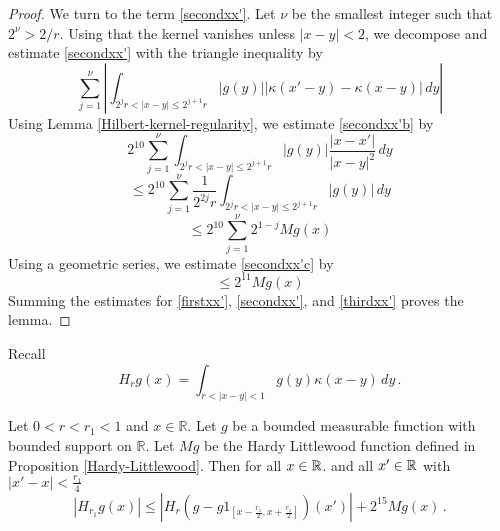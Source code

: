 {\begin{proof}
We turn to the term \eqref{secondxx'}.
Let $\nu$ be the smallest integer
such that $2^\nu> 2/r$.
Using that the kernel vanishes unless $|x-y|<2$, we decompose and estimate
\eqref{secondxx'}
with the triangle inequality by
\begin{equation}\label{secondxx'b}
 \sum_{j=1}^\nu  \left|\int_{2^jr<|x-y|\le 2^{j+1}r}
|g(y)| |\kappa(x'-y)-\kappa(x-y)|\, dy
\right|
\end{equation}
Using Lemma \ref{Hilbert-kernel-regularity}, we estimate  \eqref{secondxx'b}
by
\begin{equation*}
 2^{10}\sum_{j=1}^\nu  \int_{2^jr<|x-y|\le 2^{j+1}r}
|g(y)| \frac{|x-x'|}{|x-y|^2}\, dy
\end{equation*}
\begin{equation*}
\le  2^{10}\sum_{j=1}^\nu  \frac 1{2^{2j}r}\int_{2^jr<|x-y|\le 2^{j+1}r}
|g(y)| \, dy
\end{equation*}
\begin{equation}\label{secondxx'c}
\le  2^{10}\sum_{j=1}^\nu {2^{1-j}} Mg(x)
\end{equation}
Using a geometric series, we estimate
\eqref{secondxx'c} by
\begin{equation}\label{secondxx'd}
\le  2^{11} Mg(x)
\end{equation}
Summing the estimates
for \eqref{firstxx'},
\eqref{secondxx'}, and
\eqref{thirdxx'}
proves the lemma.
\end{proof}

Recall
\begin{equation*}
    H_rg(x)=\int_{r<|x-y|<1} g(y) \kappa(x-y)\, dy\, .
\end{equation*}


\begin{lemma}
\label{Cotlar-control}
Let $0<r<r_1<1$ and  $x\in \mathbb{R}$. Let $g$ be a bounded measurable function with bounded support on $\mathbb{R}$. Let $Mg$ be the Hardy Littlewood function
defined in Proposition
\ref{Hardy-Littlewood}.
Then for all $x\in {\mathbb{R}}$.
and all $x'\in {\mathbb{R}}$ with $|x'-x|<\frac {r_1}4$
\begin{equation}\label{eq-cotlar-control}
\left|H_{r_1} g(x)
\right|\le
|H_{r}(g-g1_{[x-\frac {r_1} 2,x+\frac {r_1}2]})(x')|+
2^{15}Mg(x)\, .
\end{equation}
\end{lemma}

}
